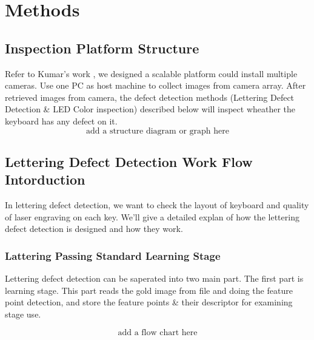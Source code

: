 \chapter{Methods}
\label{c:methods}

\section{Inspection Platform Structure}
Refer to Kumar's work \cite{kumar2008computer}, we designed a scalable platform could install multiple cameras. Use one PC as host machine to collect images from camera array.
After retrieved images from camera, the defect detection methods (Lettering Defect Detection \& LED Color inspection) described below will inspect wheather the keyboard has any defect on it. 
$$ \textrm{add a structure diagram or graph here}$$

\section{Lettering Defect Detection Work Flow Intorduction}
\label{letteringDetection}
	In lettering defect detection, we want to check the layout of keyboard and quality of laser engraving on each key.
	We'll give a detailed explan of how the lettering defect detection is designed and how they work.

	\subsection{Lattering Passing Standard Learning Stage} 
		Lettering defect detection can be saperated into two main part.
		The first part is learning stage. This part reads the gold image from file and doing the feature point detection, and store the feature points \& their descriptor for examining stage use.
		
		$$ \textrm{add a flow chart here} $$

